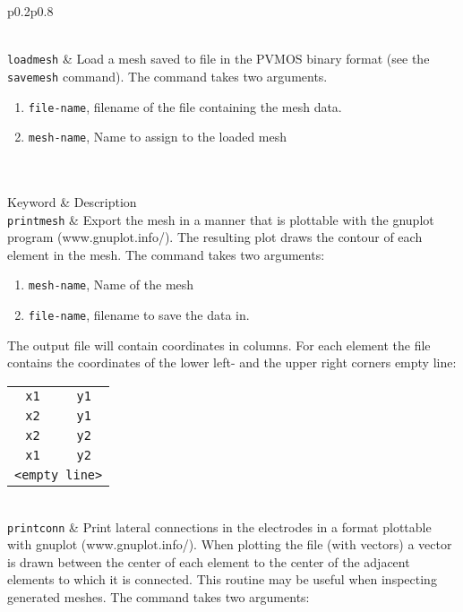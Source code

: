 \documentclass[noshowpacs,preprintnumbers,amsmath,amssymb, letter]{revtex4}
\begin{document}
\begin{longtable}{p{}p{}}
\begin{enumerate}
\end{enumerate}\\
\texttt{loadmesh}	& Load a mesh saved to file in the PVMOS binary format (see the \texttt{savemesh} command). The command takes two arguments.
\begin{enumerate}
\item \texttt{file-name}, filename of the file containing the mesh data.
\item \texttt{mesh-name}, Name to assign to the loaded mesh
\end{enumerate}\\
 \\*
\hline
Keyword & Description \\
\texttt{printmesh}	& Export the mesh in a manner that is plottable with the gnuplot program (www.gnuplot.info/). The resulting plot draws the contour of each element in the mesh. The command takes two arguments:
\begin{enumerate}
\item \texttt{mesh-name}, Name of the mesh
\item \texttt{file-name}, filename to save the data in.
\end{enumerate}
The output file will contain coordinates in columns. For each element the file contains the coordinates of the lower left- and the upper right corners empty line:\newline 
\begin{tabular}{cc}
	\texttt{x1} & \texttt{y1} \\
	\texttt{x2} & \texttt{y1} \\
	\texttt{x2} & \texttt{y2} \\
	\texttt{x1} & \texttt{y2} \\
	\multicolumn{2}{l}{\texttt{<empty line>}}\\
\end{tabular}\\
\texttt{printconn}	& Print lateral connections in the electrodes in a format plottable with gnuplot (www.gnuplot.info/). When plotting the file (with vectors) a vector is drawn between the center of each element to the center of the adjacent elements to which it is connected. This routine may be useful when inspecting generated meshes. The command takes two arguments:

\end{longtable}
\end{document}
